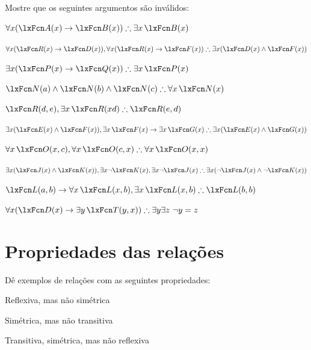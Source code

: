 \problempart
Mostre que os seguintes argumentos são inválidos:
\begin{compactlist}
\item $\forall x(\atom{A}{x} \eif \atom{B}{x}) \therefore \exists x\,\atom{B}{x}$
\item $\forall x(\atom{R}{x} \eif \atom{D}{x}), \forall x(\atom{R}{x} \eif \atom{F}{x}) \therefore \exists x(\atom{D}{x} \eand \atom{F}{x})$
\item $\exists x(\atom{P}{x}\eif \atom{Q}{x}) \therefore \exists x\,\atom{P}{x}$
\item $\atom{N}{a} \eand \atom{N}{b} \eand \atom{N}{c} \therefore \forall x\,\atom{N}{x}$
\item $\atom{R}{d,e}, \exists x\,\atom{R}{xd} \therefore \atom{R}{e,d}$
\item $\exists x(\atom{E}{x} \eand \atom{F}{x}), \exists x\,\atom{F}{x} \eif \exists x\,\atom{G}{x} \therefore \exists x(\atom{E}{x} \eand \atom{G}{x})$
\item $\forall x\,\atom{O}{x,c}, \forall x\,\atom{O}{c,x} \therefore \forall x\,\atom{O}{x,x}$
\item $\exists x(\atom{J}{x} \eand \atom{K}{x}), \exists x \enot \atom{K}{x}, \exists x \enot \atom{J}{x} \therefore \exists x(\enot \atom{J}{x} \eand \enot \atom{K}{x})$
\item $\atom{L}{a,b} \eif \forall x\,\atom{L}{x,b}, \exists x\,\atom{L}{x,b} \therefore \atom{L}{b,b}$
\item $\forall x(\atom{D}{x} \eif \exists y\,\atom{T}{y,x}) \therefore \exists y \exists z\ \enot y= z$
\end{compactlist}


\chapter{Propriedades das relações}
\setcounter{ProbPart}{0}

\solutions
\problempart
Dê exemplos de relações com as seguintes propriedades:
\begin{compactlist}
	\item Reflexiva, mas não simétrica \hfill{}

	\item Simétrica, mas não transitiva \hfill{}

	\item Transitiva, simétrica, mas não reflexiva
	\hfill{}
\end{compactlist}

